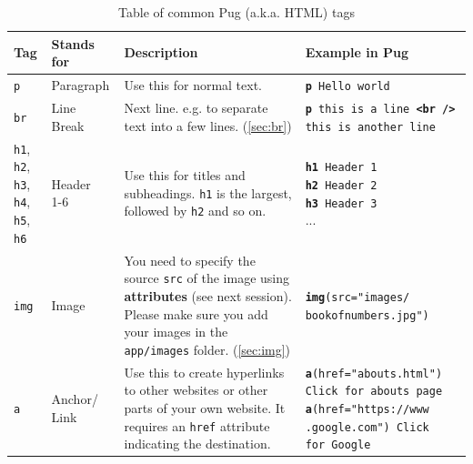\begin{table}[H]
    \centering
    \label{fig:htmltags}
    \caption{Table of common Pug (a.k.a. HTML) tags}
    \vspace{6mm}
    \begin{tabular}{|m{3.5em}|m{4.5em}|m{12em}|m{13em}|}
        \hline
        \textbf{Tag} & 
        Stands for &    
        Description & 
        Example in Pug
        \\ \hline \hline
        
        \texttt{p} &
        Paragraph & 
        Use this for normal text. &
        \texttt{\textbf{p} Hello world}
        \\ \hline
        
        \texttt{br} &
        Line Break & 
        Next line. e.g. to separate text into a few lines. (\cref{sec:br}) &
        \texttt{\textbf{p} this is a line \textbf{<br />} this is another line}
        \\ \hline
        
        \makecell[lb]{
            \texttt{h1}, \texttt{h2},\\ \texttt{h3}, \texttt{h4},\\ \texttt{h5}, \texttt{h6}
        } &
        \makecell[lb]{
        Header \\ 1-6 
        } & 
        Use this for titles and subheadings. \texttt{h1} is the largest, followed by \texttt{h2} and so on. &
        \makecell[lb]{
            \texttt{\textbf{h1} Header 1} \\
            \texttt{\textbf{h2} Header 2} \\
            \texttt{\textbf{h3} Header 3} \\
            ...
        }
        \\ \hline
        
        \texttt{img} &
        Image & 
        You need to specify the source \texttt{src} of the image using \textbf{attributes} (see next session). Please make sure you add your images in the \texttt{app/images} folder. (\cref{sec:img}) &
        \texttt{\textbf{img}(src="images/ bookofnumbers.jpg")}
        \\ \hline
        
        \texttt{a} &
        Anchor/ Link &
        Use this to create hyperlinks to other websites or other parts of your own website. It requires an \texttt{href} attribute indicating the destination. &
        \makecell[lb]{
            \texttt{\textbf{a}(href="abouts.html")}\\\texttt{Click for abouts page} \\
            \texttt{\textbf{a}(href="https://www}\\\texttt{.google.com") Click}\\\texttt{for Google}
        }
        \\ \hline
        

\end{tabular}
\end{table}
